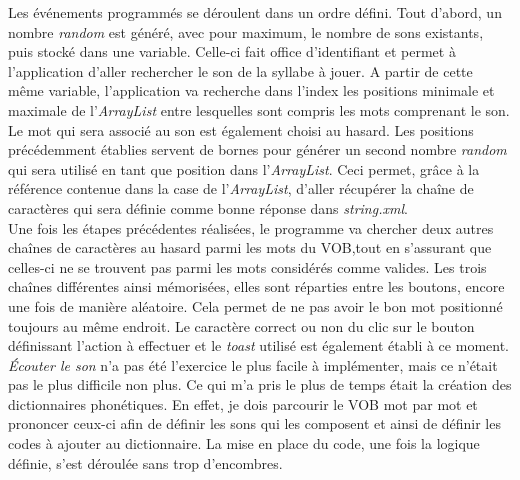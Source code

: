 Les événements programmés se déroulent dans un ordre défini. Tout d'abord, un nombre \textit{random} est généré, avec pour maximum, le nombre de sons existants, puis stocké dans une variable. Celle-ci fait office d'identifiant et permet à l'application d'aller rechercher le son de la syllabe à jouer. A partir de cette même variable, l'application va recherche dans l'index les positions minimale et maximale de l'\textit{ArrayList} entre lesquelles sont compris les mots comprenant le son. Le mot qui sera associé au son est également choisi au hasard. Les positions précédemment établies servent de bornes pour générer un second nombre \textit{random} qui sera utilisé en tant que position dans l'\textit{ArrayList}. Ceci permet, grâce à la référence contenue dans la case de l'\textit{ArrayList}, d'aller récupérer la chaîne de caractères qui sera définie comme bonne réponse dans \textit{string.xml}.\\

Une fois les étapes précédentes réalisées, le programme va chercher deux autres chaînes de caractères au hasard parmi les mots du VOB,tout en s'assurant que celles-ci ne se trouvent pas parmi les mots considérés comme valides. Les trois chaînes différentes ainsi mémorisées, elles sont réparties entre les boutons, encore une fois de manière aléatoire. Cela permet de ne pas avoir le bon mot positionné toujours au même endroit. Le caractère correct ou non du clic sur le bouton définissant l'action à effectuer et le \textit{toast} utilisé est également établi à ce moment.\\

\textit{Écouter le son} n'a pas été l'exercice le plus facile à implémenter, mais ce n'était pas le plus difficile non plus. Ce qui m'a pris le plus de temps était la création des dictionnaires phonétiques. En effet, je dois parcourir le VOB mot par mot et prononcer ceux-ci afin de définir les sons qui les composent et ainsi de définir les codes à ajouter au dictionnaire. La mise en place du code, une fois la logique définie, s'est déroulée sans trop d'encombres.

